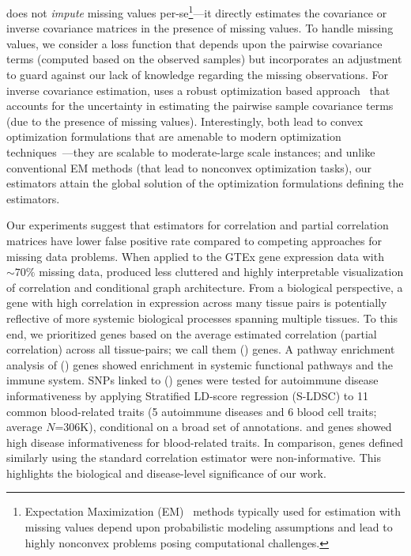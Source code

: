 \Robocov{} does not \emph{impute} missing values per-se\footnote{Expectation Maximization (EM)~\cite{Dempster1977} methods typically used for estimation with missing values depend upon probabilistic modeling assumptions and lead to highly nonconvex problems
posing computational challenges.}---it directly estimates the covariance or inverse covariance matrices in the presence of missing values. To handle missing values, we consider a loss function that depends upon the pairwise covariance terms (computed based on the observed samples) but incorporates an adjustment to guard against our lack of knowledge regarding the missing observations. For inverse covariance estimation, \Robocov{} uses a robust optimization based approach~\cite{ben2009robust,bertsimas2011theory} that accounts for the uncertainty in estimating the pairwise sample covariance terms (due to the presence of missing values). Interestingly, both lead to convex optimization formulations that are amenable to modern optimization techniques~\cite{BV2004}---they are scalable to moderate-large scale instances; and unlike conventional EM methods (that lead to nonconvex optimization tasks), our estimators attain the global solution of the optimization formulations defining the 
\Robocov{} estimators. 

Our experiments suggest that \Robocov{} estimators for correlation and partial correlation matrices have lower false positive rate compared to competing approaches for missing data problems.  When applied to the GTEx gene expression data with~$\sim70\%$ missing data, \Robocov{} produced less cluttered and highly interpretable visualization of correlation and conditional graph architecture. From a biological perspective, a gene with high correlation in expression across many tissue pairs is potentially reflective of more systemic biological processes spanning multiple tissues. To this end, we prioritized genes based on the average \Robocov{} estimated correlation (partial correlation) across all tissue-pairs; we call them  \Robospan{} (\pRobospan{}) genes. A pathway enrichment analysis of  \Robospan{} (\pRobospan{}) genes showed enrichment in systemic functional pathways and the immune system.  SNPs linked to \Robospan{} (\pRobospan{}) genes were tested for autoimmune disease informativeness by applying Stratified LD-score regression (S-LDSC) to 11 common blood-related traits (5 autoimmune diseases and 6 blood cell traits; average $N$=306K), conditional on a broad set of  annotations. \Robospan{} and \pRobospan{} genes showed high disease informativeness for blood-related traits. In comparison, \Corspan{} genes defined similarly using the standard correlation estimator were non-informative. This highlights the biological and disease-level significance of our work.



